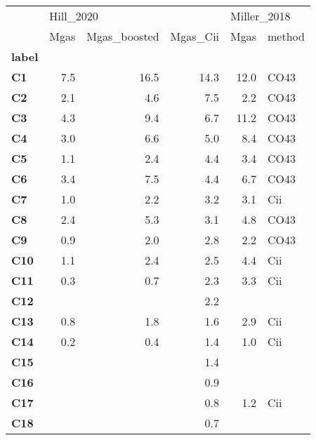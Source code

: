 \begin{tabular}{lrrrrl}
\toprule
{} & \multicolumn{3}{l}{Hill\_2020} & \multicolumn{2}{l}{Miller\_2018} \\
{} &      Mgas & Mgas\_boosted & Mgas\_Cii &        Mgas & method \\
\textbf{label    } &           &              &          &             &        \\
\midrule
\textbf{C1       } &       7.5 &         16.5 &     14.3 &        12.0 &   CO43 \\
\textbf{C2       } &       2.1 &          4.6 &      7.5 &         2.2 &   CO43 \\
\textbf{C3       } &       4.3 &          9.4 &      6.7 &        11.2 &   CO43 \\
\textbf{C4       } &       3.0 &          6.6 &      5.0 &         8.4 &   CO43 \\
\textbf{C5       } &       1.1 &          2.4 &      4.4 &         3.4 &   CO43 \\
\textbf{C6       } &       3.4 &          7.5 &      4.4 &         6.7 &   CO43 \\
\textbf{C7       } &       1.0 &          2.2 &      3.2 &         3.1 &    Cii \\
\textbf{C8       } &       2.4 &          5.3 &      3.1 &         4.8 &   CO43 \\
\textbf{C9       } &       0.9 &          2.0 &      2.8 &         2.2 &   CO43 \\
\textbf{C10      } &       1.1 &          2.4 &      2.5 &         4.4 &    Cii \\
\textbf{C11      } &       0.3 &          0.7 &      2.3 &         3.3 &    Cii \\
\textbf{C12      } &           &              &      2.2 &             &        \\
\textbf{C13      } &       0.8 &          1.8 &      1.6 &         2.9 &    Cii \\
\textbf{C14      } &       0.2 &          0.4 &      1.4 &         1.0 &    Cii \\
\textbf{C15      } &           &              &      1.4 &             &        \\
\textbf{C16      } &           &              &      0.9 &             &        \\
\textbf{C17      } &           &              &      0.8 &         1.2 &    Cii \\
\textbf{C18      } &           &              &      0.7 &             &        \\

\end{tabular}
